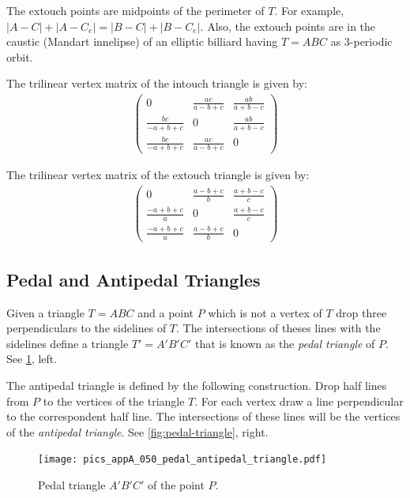 The extouch points are midpoints of the perimeter of $T$. For example, $|A-C|+|A-C_e|=|B-C|+|B-C_e|$. Also, the extouch points are in the caustic (Mandart innelipse) of an elliptic billiard having $T=ABC$ as 3-periodic orbit.

The trilinear vertex matrix of the intouch triangle is given by:
\begin{align*}
    \left(\begin{matrix}
    0 &\frac{ac}{a-b+c} &\frac{ab}{a+b-c}\\
     \frac{bc}{-a+b+c} & 0 &\frac{ab}{a+b-c}\\
       \frac{bc}{-a+b+c}   &\frac{ac}{a-b+c}&0  
    \end{matrix}\right)
\end{align*}

The trilinear vertex matrix of the extouch triangle is given by:
\begin{align*}
    \left(\begin{matrix}
    0 &\frac {a-b+c}{b} &\frac{a+b-c}{c}\\
     \frac{-a+b+c}{a} & 0 &\frac{a+b-c}{c}\\
       \frac{-a+b+c}{a}   &\frac{a-b+c}{b}&0  
    \end{matrix}\right)
\end{align*}

\subsection{Pedal and Antipedal Triangles}

Given a triangle $T=ABC$  and a point $P$ which is not a vertex of $T$ drop three perpendiculars to the sidelines of $T$. The intersections of theses lines with the sidelines define a triangle $T'=A'B'C'$ that is known as the {\em pedal triangle} of $P$. See \cref{fig:appA-pedal-triangle}, left.

The antipedal triangle is defined by the following construction.
Drop half lines from $P$ to the vertices of the triangle $T$. For each vertex draw a line perpendicular to the correspondent half  line. The intersections of these  lines will be the vertices of the {\em antipedal triangle}. See \cref{fig:pedal-triangle}, right.
 \begin{figure}[H]
      \texttt{[image: pics\_appA\_050\_pedal\_antipedal\_triangle.pdf]}
    \caption{Pedal triangle $A'B'C'$ of the point $P$.}
    \label{fig:appA-pedal-triangle}
\end{figure}

